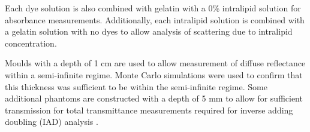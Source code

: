 Each dye solution is also combined with gelatin with a 0\% intralipid solution for absorbance measurements.
Additionally, each intralipid solution is combined with a gelatin solution with no dyes to allow analysis of scattering due to intralipid concentration.

Moulds with a depth of 1 cm are used to allow measurement of diffuse reflectance within a semi-infinite regime\cite{Zhang2014}.
Monte Carlo simulations were used to confirm that this thickness was sufficient to be within the semi-infinite regime.
Some additional phantoms are constructed with a depth of 5 mm to allow for sufficient transmission for total transmittance measurements required for inverse adding doubling (IAD) analysis \cite{Prahl2017}. 



